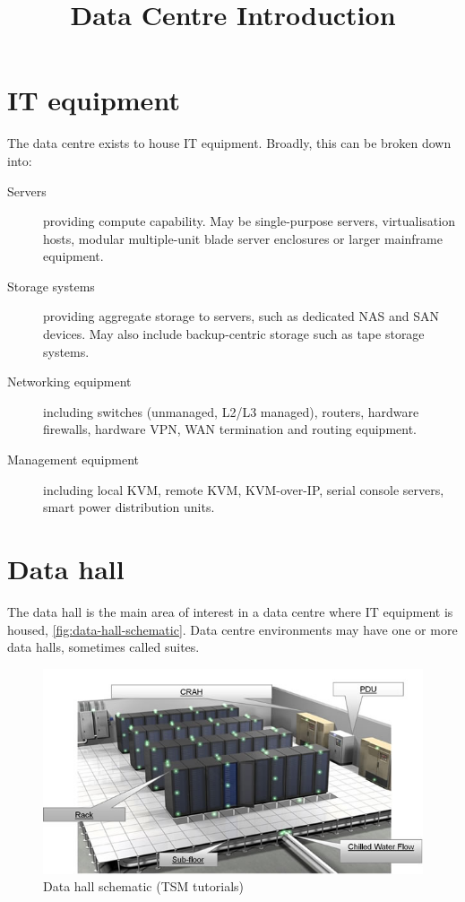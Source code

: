 \documentclass{pgnotes}
\title{Data Centre Introduction}
\begin{document}
\maketitle

\section{IT equipment}

The data centre exists to house IT equipment.
Broadly, this can be broken down into:
\begin{description}
\item[Servers] providing compute capability. May be single-purpose servers, virtualisation hosts, modular multiple-unit blade server enclosures or larger mainframe equipment.
\item[Storage systems] providing aggregate storage to servers, such as dedicated NAS and SAN devices. May also include backup-centric storage such as tape storage systems.
\item[Networking equipment] including switches (unmanaged, L2/L3 managed), routers, hardware firewalls, hardware VPN, WAN termination and routing equipment.
\item[Management equipment] including local KVM, remote KVM, KVM-over-IP, serial console servers, smart power distribution units.
\end{description}


\section{Data hall}

The data hall is the main area of interest in a data centre where IT equipment is housed, \autoref{fig:data-hall-schematic}.
Data centre environments may have one or more data halls, sometimes called suites.

\begin{figure}[htbp]
  \centering
  \includegraphics[width=1.0\linewidth]{data_hall}
  \caption{Data hall schematic (TSM tutorials)}
  \label{fig:data-hall-schematic}
\end{figure}
\end{document}
